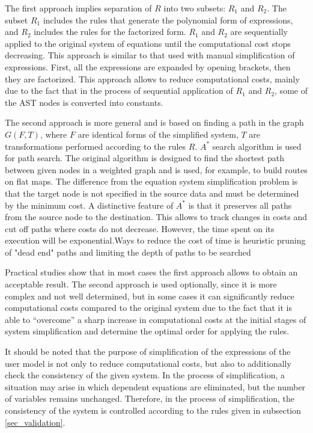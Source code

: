 \documentclass[lettersize,journal]{IEEEtran}
\begin{document}
The first approach implies separation of \(R\) into two subsets: \(R_1\) and \(R_2\). The subset \(R_1\) includes the rules that generate the 
polynomial form of expressions, and \(R_2\) includes the rules for the factorized form. \(R_1\) and \(R_2\) are sequentially applied to the original 
system of equations until the computational cost stops decreasing. This approach is similar to that used with manual simplification of expressions. 
First, all the expressions are expanded by opening brackets, then they are factorized. This approach allows to reduce computational costs, mainly due to 
the fact that in the process of sequential application of \(R_1\) and \(R_2\), some of the AST nodes is converted into constants.

The second approach is more general and is based on finding a path in the graph \(G(F,T)\), where \(F\) are identical forms of the simplified system,
\(T\) are transformations performed according to the rules \(R\). \(A^*\) search algorithm \cite{pearl84} is used for path search. The original
algorithm is designed to find the shortest path between given nodes in a weighted graph and is used, for example, to build routes on flat maps. 
The difference from the equation system simplification problem is that the target node is not specified in the source data and must be determined 
by the minimum cost. A distinctive feature of \(A^*\) is that it preserves all paths from the source node to the destination. This allows to track
changes in costs and cut off paths where costs do not decrease. However, the time spent on its execution will be exponential.Ways to reduce
the cost of time is heuristic pruning of "dead end" paths and limiting the depth of paths to be searched

Practical studies show that in most cases the first approach allows to obtain an acceptable result. The second approach is used optionally, 
since it is more complex and not well determined, but in some cases it can significantly reduce computational costs compared to the original 
system due to the fact that it is able to “overcome” a sharp increase in computational costs at the initial stages of system 
simplification and determine the optimal order for applying the rules.

It should be noted that the purpose of simplification of the expressions of the user model is not only to reduce computational costs, but also to
additionally check the consistency of the given system. In the process of simplification, a situation may arise in which dependent equations are
eliminated, but the number of variables remains unchanged. Therefore, in the process of simplification, the consistency of the system is controlled
according to the rules given in subsection \ref{sec_validation}.
\end{document}
